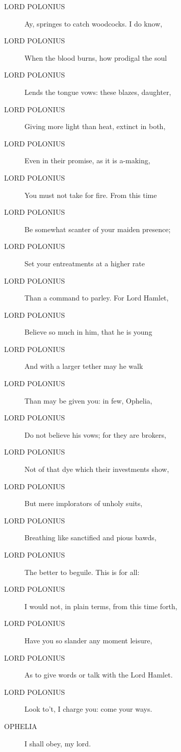\documentclass{article}
\begin{document}
\begin{description}
            
\item[LORD POLONIUS] Ay, springes to catch woodcocks. I do know,
\item[LORD POLONIUS] When the blood burns, how prodigal the soul
\item[LORD POLONIUS] Lends the tongue vows: these blazes, daughter,
\item[LORD POLONIUS] Giving more light than heat, extinct in both,
\item[LORD POLONIUS] Even in their promise, as it is a-making,
\item[LORD POLONIUS] You must not take for fire. From this time
\item[LORD POLONIUS] Be somewhat scanter of your maiden presence;
\item[LORD POLONIUS] Set your entreatments at a higher rate
\item[LORD POLONIUS] Than a command to parley. For Lord Hamlet,
\item[LORD POLONIUS] Believe so much in him, that he is young
\item[LORD POLONIUS] And with a larger tether may he walk
\item[LORD POLONIUS] Than may be given you: in few, Ophelia,
\item[LORD POLONIUS] Do not believe his vows; for they are brokers,
\item[LORD POLONIUS] Not of that dye which their investments show,
\item[LORD POLONIUS] But mere implorators of unholy suits,
\item[LORD POLONIUS] Breathing like sanctified and pious bawds,
\item[LORD POLONIUS] The better to beguile. This is for all:
\item[LORD POLONIUS] I would not, in plain terms, from this time forth,
\item[LORD POLONIUS] Have you so slander any moment leisure,
\item[LORD POLONIUS] As to give words or talk with the Lord Hamlet.
\item[LORD POLONIUS] Look to't, I charge you: come your ways.
\end{description}
          
\begin{description}
            
\item[OPHELIA] I shall obey, my lord.
\end{description}
          
\end{document}

